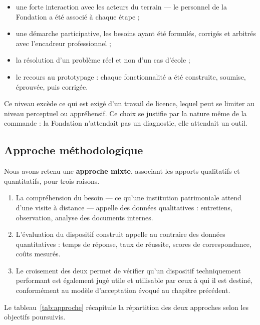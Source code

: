 \begin{itemize}
  \item une forte interaction avec les acteurs du terrain — le personnel de la
        Fondation a été associé à chaque étape ;
  \item une démarche participative, les besoins ayant été formulés, corrigés et
        arbitrés avec l'encadreur professionnel ;
  \item la résolution d'un problème réel et non d'un cas d'école ;
  \item le recours au prototypage : chaque fonctionnalité a été construite,
        soumise, éprouvée, puis corrigée.
\end{itemize}

Ce niveau excède ce qui est exigé d'un travail de licence, lequel peut se
limiter au niveau perceptuel ou appréhensif. Ce choix se justifie par la nature
même de la commande : la Fondation n'attendait pas un diagnostic, elle attendait
un outil.

\subsection{Approche méthodologique}

Nous avons retenu une \textbf{approche mixte}, associant les apports qualitatifs
et quantitatifs, pour trois raisons.

\begin{enumerate}
  \item La compréhension du besoin — ce qu'une institution patrimoniale attend
        d'une visite à distance — appelle des données qualitatives : entretiens,
        observation, analyse des documents internes.
  \item L'évaluation du dispositif construit appelle au contraire des données
        quantitatives : temps de réponse, taux de réussite, scores de
        correspondance, coûts mesurés.
  \item Le croisement des deux permet de vérifier qu'un dispositif
        techniquement performant est également jugé utile et utilisable par
        ceux à qui il est destiné, conformément au modèle d'acceptation évoqué
        au chapitre précédent.
\end{enumerate}

Le tableau~\ref{tab:approche} récapitule la répartition des deux approches selon
les objectifs poursuivis.

